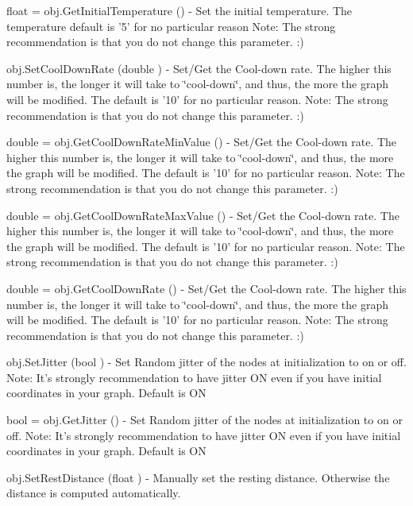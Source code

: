 \begin{DoxyItemize}
\item {\ttfamily float = obj.\-Get\-Initial\-Temperature ()} -\/ Set the initial temperature. The temperature default is '5' for no particular reason Note\-: The strong recommendation is that you do not change this parameter. \-:)  
\item {\ttfamily obj.\-Set\-Cool\-Down\-Rate (double )} -\/ Set/\-Get the Cool-\/down rate. The higher this number is, the longer it will take to \char`\"{}cool-\/down\char`\"{}, and thus, the more the graph will be modified. The default is '10' for no particular reason. Note\-: The strong recommendation is that you do not change this parameter. \-:)  
\item {\ttfamily double = obj.\-Get\-Cool\-Down\-Rate\-Min\-Value ()} -\/ Set/\-Get the Cool-\/down rate. The higher this number is, the longer it will take to \char`\"{}cool-\/down\char`\"{}, and thus, the more the graph will be modified. The default is '10' for no particular reason. Note\-: The strong recommendation is that you do not change this parameter. \-:)  
\item {\ttfamily double = obj.\-Get\-Cool\-Down\-Rate\-Max\-Value ()} -\/ Set/\-Get the Cool-\/down rate. The higher this number is, the longer it will take to \char`\"{}cool-\/down\char`\"{}, and thus, the more the graph will be modified. The default is '10' for no particular reason. Note\-: The strong recommendation is that you do not change this parameter. \-:)  
\item {\ttfamily double = obj.\-Get\-Cool\-Down\-Rate ()} -\/ Set/\-Get the Cool-\/down rate. The higher this number is, the longer it will take to \char`\"{}cool-\/down\char`\"{}, and thus, the more the graph will be modified. The default is '10' for no particular reason. Note\-: The strong recommendation is that you do not change this parameter. \-:)  
\item {\ttfamily obj.\-Set\-Jitter (bool )} -\/ Set Random jitter of the nodes at initialization to on or off. Note\-: It's strongly recommendation to have jitter O\-N even if you have initial coordinates in your graph. Default is O\-N  
\item {\ttfamily bool = obj.\-Get\-Jitter ()} -\/ Set Random jitter of the nodes at initialization to on or off. Note\-: It's strongly recommendation to have jitter O\-N even if you have initial coordinates in your graph. Default is O\-N  
\item {\ttfamily obj.\-Set\-Rest\-Distance (float )} -\/ Manually set the resting distance. Otherwise the distance is computed automatically.  

\end{DoxyItemize}
